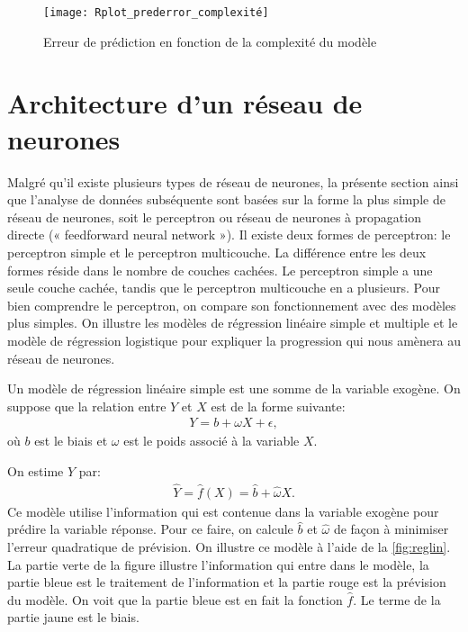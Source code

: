 \begin{figure}[h]
\centering
\caption{\label{fig:ErrPredVsComplex}Erreur de prédiction en fonction de la complexité du modèle}
\texttt{[image: Rplot\_prederror\_complexité]}
\end{figure}

\section{Architecture d'un réseau de neurones}
\label{sec:RN:architecture}

Malgré qu'il existe plusieurs types de réseau de neurones, la présente section ainsi que l'analyse de données subséquente sont basées sur la forme la plus simple de réseau de neurones, soit le perceptron ou réseau de neurones à propagation directe (« feedforward neural network »). Il existe deux formes de perceptron: le perceptron simple et le perceptron multicouche.  La différence entre les deux formes réside dans le nombre de couches cachées. Le perceptron simple a une seule couche cachée, tandis que le perceptron multicouche en a plusieurs. Pour bien comprendre le perceptron, on compare son fonctionnement avec des modèles plus simples. On illustre les modèles de régression linéaire simple et multiple et le modèle de régression logistique pour expliquer la progression qui nous amènera au réseau de neurones.





Un modèle de régression linéaire simple est une somme de la variable %
 exogène. On suppose que la relation entre $Y$ et $X$ est de la forme suivante:
\begin{align*}
Y = b+\omega X + \epsilon,
\end{align*}
où $b$ est le biais et $\omega$ est le poids associé à la variable $X$.

On estime $Y$ par:
\begin{align*}
\hat{Y} = \hat{f} (X) = \hat{b}+\hat{\omega} X.
\end{align*}
Ce modèle utilise l'information qui est contenue dans la variable exogène pour prédire la variable réponse. Pour ce faire, on calcule $\hat{b}$ et $\hat{\omega}$ de façon à minimiser l'erreur quadratique de prévision.  
On illustre ce modèle à l'aide 
de la \autoref{fig:reglin}. La partie verte de la figure illustre l'information qui entre dans le modèle, la partie bleue est le traitement de l'information et la partie rouge est la prévision du modèle. On voit que la partie bleue est en fait la fonction $\hat{f}$. Le terme de la partie jaune est le biais. 

